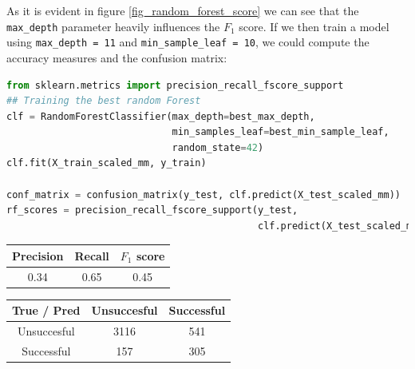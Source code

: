 As it is evident in figure \ref{fig_random_forest_score} we can see that the \texttt{max\_depth} parameter heavily influences the \(F_1\) score. If we then train a model using \texttt{max\_depth = 11} and \texttt{min\_sample\_leaf = 10}, we could compute the accuracy measures and the confusion matrix:

\begin{lstlisting}[language=Python, caption= Deploying the Random forest with the best parameters]
from sklearn.metrics import precision_recall_fscore_support
## Training the best random Forest
clf = RandomForestClassifier(max_depth=best_max_depth,
                             min_samples_leaf=best_min_sample_leaf, 
                             random_state=42)
clf.fit(X_train_scaled_mm, y_train)

conf_matrix = confusion_matrix(y_test, clf.predict(X_test_scaled_mm))
rf_scores = precision_recall_fscore_support(y_test,
                                            clf.predict(X_test_scaled_mm))
\end{lstlisting}
\begin{center}
    \begin{tabular}{|c|c|c|}
        \hline
        Precision & Recall & \(F_1\) score \\
        \hline
        0.34 & 0.65 & 0.45 \\
        \hline
    \end{tabular}
    \quad     
    \begin{tabular}{|c|c|c|}
        \hline
         True / Pred & Unsuccesful & Successful \\
        \hline
        Unsuccesful & 3116 & 541 \\
        \hline
        Successful & 157 & 305\\
        \hline
    \end{tabular}
\end{center}

